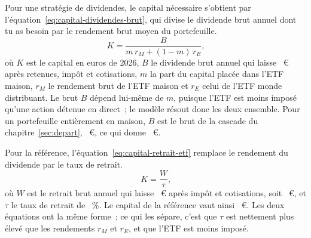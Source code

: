 
Pour une strat\'egie de dividendes, le capital n\'ecessaire s'obtient par
l'\'equation~\eqref{eq:capital-dividendes-brut}, qui divise le dividende brut annuel dont tu as besoin
par le rendement brut moyen du portefeuille.
\begin{equation}
  K = \frac{B}{m\,r_M + (1-m)\,r_E} \text{,} \label{eq:capital-dividendes-brut}
\end{equation}
o\`u $K$ est le capital en euros de 2026, $B$ le dividende brut annuel qui laisse \ZielJahr~€ apr\`es
retenues, imp\^ot et cotisations, $m$ la part du capital plac\'ee dans l'ETF maison, $r_M$ le rendement
brut de l'ETF maison et $r_E$ celui de l'ETF monde distribuant. Le brut $B$ d\'epend lui-m\^eme de
$m$, puisque l'ETF est moins impos\'e qu'une action d\'etenue en direct~; le mod\`ele r\'esout donc les
deux ensemble. Pour un portefeuille enti\`erement en maison, $B$ est le brut de la cascade du
chapitre~\ref{sec:depart}, \BruttoNoetig~€, ce qui donne \KapitalMaisonHundert~€.

Pour la r\'ef\'erence, l'\'equation~\eqref{eq:capital-retrait-etf} remplace le rendement du dividende
par le taux de retrait.
\begin{equation}
  K = \frac{W}{\tau} \text{,} \label{eq:capital-retrait-etf}
\end{equation}
o\`u $W$ est le retrait brut annuel qui laisse \ZielJahr~€ apr\`es imp\^ot et cotisations, soit
\RetraitBrutEtf~€, et $\tau$ le taux de retrait de \TauxRetrait~\%. Le capital de la r\'ef\'erence vaut
ainsi \KapitalEtfReferenz~€. Les deux \'equations ont la m\^eme forme~; ce qui les s\'epare, c'est que
$\tau$ est nettement plus \'elev\'e que les rendements $r_M$ et $r_E$, et que l'ETF est moins
impos\'e.

